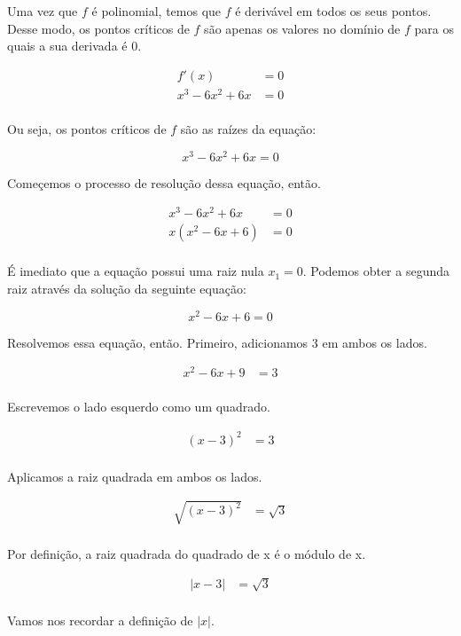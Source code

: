 \documentclass{article}
\begin{document}
Uma vez que \(f\) é polinomial, temos que \(f\) é derivável em todos os seus
pontos. Desse modo, os pontos críticos de \(f\) são apenas os valores no
domínio de \(f\) para os quais a sua derivada é \(0\).

\begin{align*}
    f'(x)          & = 0 \\
    x^{3}-6x^2+ 6x & = 0 \\
\end{align*}

Ou seja, os pontos críticos de \(f\) são as raízes da equação:

\[
    x^{3}-6x^2+ 6x = 0
\]

Começemos o processo de resolução dessa equação, então.

\begin{align*}
    x^{3}-6x^2+ 6x & = 0 \\
    x(x^2-6x+6)    & = 0 \\
\end{align*}

É imediato que a equação possui uma raiz nula \(x_1 = 0\). Podemos obter a segunda
raiz através da solução da seguinte equação:

\[
    x^2-6x+6 = 0
\]

Resolvemos essa equação, então. Primeiro, adicionamos \(3\) em ambos os lados.

\begin{align*}
    x^2-6x+9 & = 3 \\
\end{align*}

Escrevemos o lado esquerdo como um quadrado.

\begin{align*}
    (x-3)^2 & = 3 \\
\end{align*}

Aplicamos a raiz quadrada em ambos os lados.

\begin{align*}
    \sqrt{(x-3)^2} & = \sqrt{3} \\
\end{align*}

Por definição, a raiz quadrada do quadrado de x é o módulo de x.

\begin{align*}
    |x-3| & = \sqrt{3} \\
\end{align*}

Vamos nos recordar a definição de \(|x|\).
\end{document}
